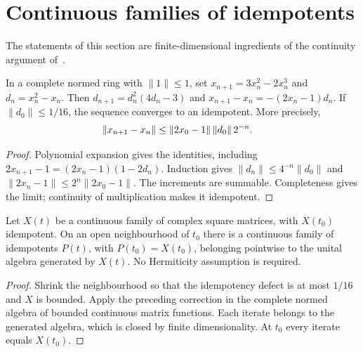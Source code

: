 \section{Continuous families of idempotents}

The statements of this section are finite-dimensional ingredients of the
continuity argument of~\cite[Section~II.F.2]{Schuch2011Phases}.

\begin{lemma}
    \label{thm:spt_newton_idempotent}
    \leanok
    In a complete normed ring with $\|1\|\le1$, set
    $x_{n+1}=3x_n^2-2x_n^3$ and $d_n=x_n^2-x_n$.
    Then $d_{n+1}=d_n^2(4d_n-3)$ and
    $x_{n+1}-x_n=-(2x_n-1)d_n$.
    If $\|d_0\|\le1/16$, the sequence converges to an idempotent.
    More precisely,
    \begin{align}
        \|x_{n+1}-x_n\| & \le
        \|2x_0-1\|\,\|d_0\|\,2^{-n}.
        \notag
    \end{align}
\end{lemma}

\begin{proof}
    \leanok
    Polynomial expansion gives the identities, including
    $2x_{n+1}-1=(2x_n-1)(1-2d_n)$.
    Induction gives $\|d_n\|\le4^{-n}\|d_0\|$ and
    $\|2x_n-1\|\le2^n\|2x_0-1\|$. The increments are summable.
    Completeness gives the limit; continuity of multiplication makes it
    idempotent.
\end{proof}

\begin{lemma}
    \label{thm:spt_continuous_nearby_idempotent}
    \leanok
    Let $X(t)$ be a continuous family of complex square matrices,
    with $X(t_0)$ idempotent. On an open neighbourhood of $t_0$ there is
    a continuous family of idempotents $P(t)$, with $P(t_0)=X(t_0)$,
    belonging pointwise to the unital algebra generated by $X(t)$.
    No Hermiticity assumption is required.
\end{lemma}

\begin{proof}
    \leanok
    Shrink the neighbourhood so that the idempotency defect is at most
    $1/16$ and $X$ is bounded. Apply the preceding correction in the
    complete normed algebra of bounded continuous matrix functions.
    Each iterate belongs to the generated algebra, which is closed
    by finite dimensionality. At $t_0$ every iterate equals $X(t_0)$.
\end{proof}

